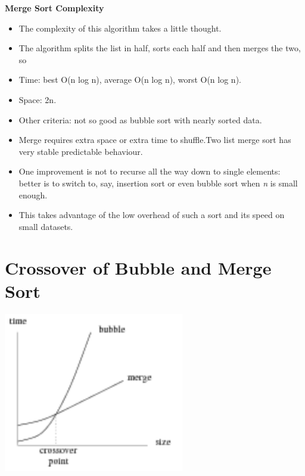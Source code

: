 \documentclass{beamer}
\begin{document}
\begin{frame} 
\begin{center}
\textbf{Merge Sort Complexity}
\end{center}
\begin{itemize}
\item The complexity of this algorithm takes a little thought. 
\item The algorithm splits the list in half, sorts each half and then merges the two, so 
\item Time: best O(n log n), average O(n log n), worst O(n log n).
\item Space: 2n. 
\end{itemize}

\end{frame} 

\begin{frame}
\begin{itemize}
\item Other criteria: not so good as bubble sort with nearly sorted data.
\item Merge requires extra space or extra time to shuffle.Two list merge sort has very stable predictable
behaviour.
\item One improvement is not to recurse all the way down to single elements: better is to switch to, say, insertion sort
or even bubble sort when \textit{n }is small enough.
\item This takes advantage of the low overhead of such a sort and its speed on small datasets.
\end{itemize}

\end{frame} 

\section{Crossover of Bubble and Merge Sort}
\begin{frame}

\begin{center}
\includegraphics[height=7cm,keepaspectratio]{images/image4}
\end{center}

\end{frame} 
\end{document}

